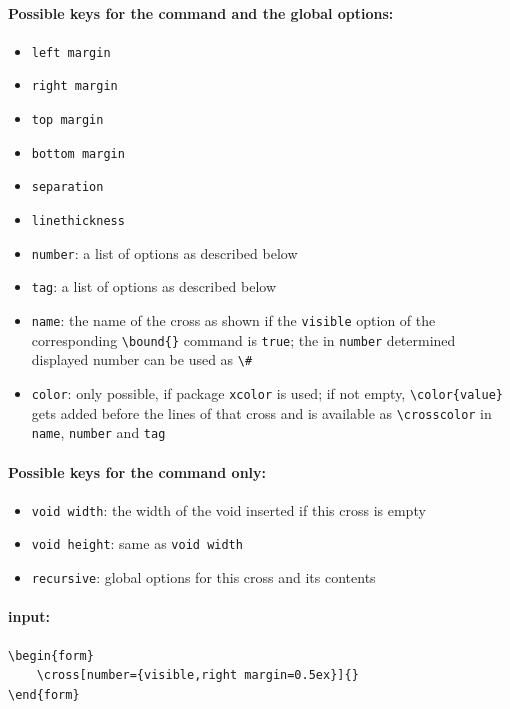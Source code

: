 \documentclass[parskip=half-]{scrartcl}
\begin{document}
\paragraph{Possible keys for the command and the global options:}
\begin{itemize}
    \item \verb|left margin|
    \item \verb|right margin|
    \item \verb|top margin|
    \item \verb|bottom margin|
    \item \verb|separation|
    \item \verb|linethickness|
    \item \verb|number|: a list of options as described below
    \item \verb|tag|: a list of options as described below
    \item \verb|name|: the name of the cross as shown if the \verb|visible| option of the corresponding \verb|\bound{}| command is \verb|true|; the in \verb|number| determined displayed number can be used as \verb|\#|
    \item \verb|color|: only possible, if package \verb|xcolor| is used; if not empty, \verb|\color{value}| gets added before the lines of that cross and is available as \verb|\crosscolor| in \verb|name|, \verb|number| and \verb|tag|
\end{itemize}

\paragraph{Possible keys for the command only:}
\begin{itemize}
    \item \verb|void width|: the width of the void inserted if this cross is empty
    \item \verb|void height|: same as \verb|void width|
    \item \verb|recursive|: global options for this cross and its contents
\end{itemize}

\paragraph{input:}
\begin{verbatim}
\begin{form}
    \cross[number={visible,right margin=0.5ex}]{}
\end{form}
\end{verbatim}
\end{document}
